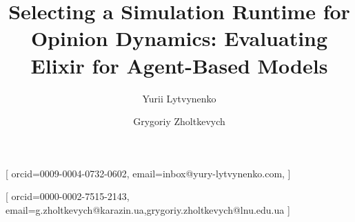 \documentclass[
]{ceurart}
\begin{document}




\author[1]{Yurii Lytvynenko}[%
orcid=0009-0004-0732-0602,
email=inbox@yury-lytvynenko.com,
]
\cormark[1]
\fnmark[1]

\author[1,2]{Grygoriy Zholtkevych}[%
orcid=0000-0002-7515-2143,
email={g.zholtkevych@karazin.ua,grygoriy.zholtkevych@lnu.edu.ua}
]
\fnmark[1]
\address[1]{V.N. Karazin Kharkiv National University,
  4 Svobody sq., Kharkiv, 61022, Ukraine}
\address[2]{Ivan Franko National University of Lviv,
  1 Universyteska Str., Lviv, 79007, Ukraine}




\title{Selecting a Simulation Runtime for Opinion Dynamics: Evaluating Elixir for Agent-Based Models}
\end{document}
